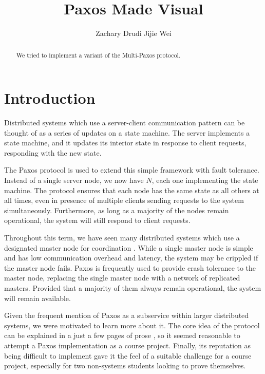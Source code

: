 \documentclass{sig-alternate}
\begin{document}
\title{Paxos Made Visual}


\author{
\alignauthor
Zachary Drudi  
\alignauthor
Jijie Wei		
}


\maketitle

\begin{abstract}
We tried to implement a variant of the Multi-Paxos protocol. 
\end{abstract}

\section{Introduction}
Distributed systems which use a server-client communication pattern can be thought of as a series of updates on a state machine. The server implements a state machine, and it updates its interior state in response to client requests, responding with the new state. 

The Paxos protocol is used to extend this simple framework with fault tolerance. Instead of a single server node, we now have $N$, each one implementing the state machine. The protocol ensures that each node has the same state as all others at all times, even in presence of multiple clients sending requests to the system simultaneously. Furthermore, as long as a majority of the nodes remain operational, the system will still respond to client requests.

Throughout this term, we have seen many distributed systems which use a designated master node for coordination \cite{dean2008mapreduce, ghemawat_google_2003}. While a single master node is simple and has low communication overhead and latency, the system may be crippled if the master node fails. Paxos is frequently used \cite{thekkath_frangipani:_1997, lee_petal:_1996, corbett_spanner:_2012, calder_windows_2011} to provide crash tolerance to the master node, replacing the single master node with a network of replicated masters. Provided that a majority of them always remain operational, the system will remain available.

Given the frequent mention of Paxos as a subservice within larger distributed systems, we were motivated to learn more about it. The core idea of the protocol can be explained in a just a few pages of prose \cite{lamport_paxos_2001}, so it seemed reasonable to attempt a Paxos implementation as a course project. Finally, its reputation as being difficult to implement gave it the feel of a suitable challenge for a course project, especially for two non-systems students looking to prove themselves.
\end{document}
